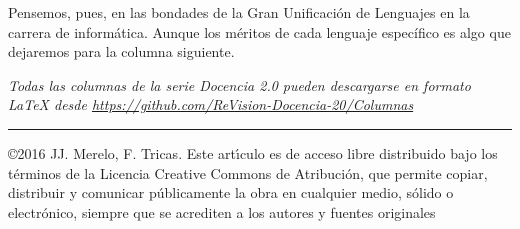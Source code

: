 \documentclass[twoside,10pt]{article}
\newcommand{\surl}[1]{{\small\url{#1}}}
\begin{document}
\begin{multicols}{2}
Pensemos, pues, en las bondades de la Gran Unificación de Lenguajes en
la carrera de informática. Aunque los méritos de cada lenguaje
específico es algo que dejaremos para la columna siguiente. 

\noindent  
\bigskip

\noindent\emph{Todas las columnas de la serie Docencia 2.0
pueden descargarse en formato LaTeX desde
\surl{https://github.com/ReVision-Docencia-20/Columnas}}

\noindent\rule{90mm}{1pt}

{\small \noindent\copyright 2016 JJ. Merelo, F. Tricas. Este art\'{\i}culo es de acceso libre distribuido bajo los t\'{e}rminos
de la Licencia Creative Commons de Atribuci\'{o}n, que permite copiar,
distribuir y comunicar p\'{u}blicamente la obra en cualquier medio, s\'{o}lido
o electr\'{o}nico, siempre que se acrediten a los autores y fuentes
originales}

\end{multicols}
\end{document}
